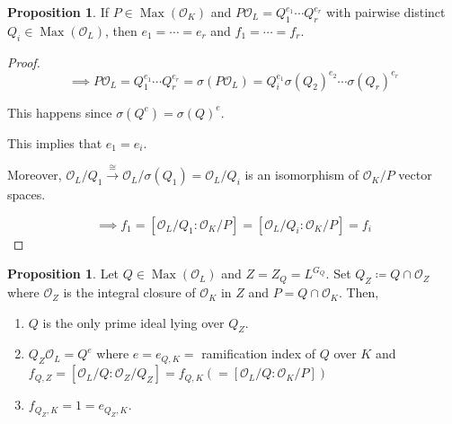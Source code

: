 \documentclass[openany]{amsbook}
\numberwithin{section}{chapter}
\theoremstyle{definition}
\newtheorem{proposition}[theorem]{Proposition}
\begin{document}
\begin{proposition}
    If \(P\in \operatorname{Max} (\mathcal{O} _K)\) and \(P \mathcal{O} _L = Q_1^{e_1}\cdots Q_r^{e_r}\) with pairwise distinct \(Q_i \in \operatorname{Max} (\mathcal{O} _L)\), then \(e_1 = \cdots = e_r\) and \(f_1 = \cdots = f_r\).
\end{proposition}

\begin{proof}
    \[
        \implies P \mathcal{O} _L = Q_1^{e_1}\cdots Q_r^{e_r} = \sigma (P\mathcal{O}_L) = Q_i^{e_1} \sigma (Q_2)^{e_2} \cdots \sigma (Q_r)^{e_r}
    \]

    This happens since \(\sigma (Q^e)=\sigma (Q)^e\).

    This implies that \(e_1 = e_i\).

    Moreover, \(\mathcal{O}_L / Q_1 \overset{\cong}{\to} \mathcal{O}_L / \sigma (Q_1) = \mathcal{O}_L / Q_i\) is an isomorphism of \(\mathcal{O} _K / P\) vector spaces.

    \[
        \implies f_1 = [\mathcal{O}_L / Q_1 : \mathcal{O}_K / P] = [\mathcal{O}_L / Q_i : \mathcal{O}_K / P] = f_i
    \]
\end{proof}

\begin{proposition}
    
Let \(Q \in \operatorname{Max}(\mathcal{O}_L)\) and \(Z = Z_Q = L^{G_Q}\). Set \(Q_Z \coloneqq Q\cap \mathcal{O}_Z\) where \(\mathcal{O}_Z\) is the integral closure of \(\mathcal{O}_K\) in \(Z\) and \(P = Q \cap \mathcal{O}_K\). Then,

    \begin{enumerate}[label=\roman*)]
        \item \(Q\) is the only prime ideal lying over \(Q_Z\).
        \item \(Q_Z \mathcal{O}_L = Q^e\) where \(e = e_{Q,K} =\) ramification index of \(Q\) over \(K\) and \(f_{Q,Z} = [\mathcal{O}_L / Q : \mathcal{O}_Z / Q_Z] = f_{Q,K} (=[\mathcal{O}_L / Q : \mathcal{O}_K / P])\)
        \item \(f_{Q_Z , K} = 1 = e_{Q_Z , K}\).  
    \end{enumerate} 

\end{proposition}

\begin{center}
\end{center}
\end{document}

